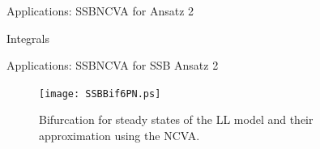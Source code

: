 \begin{frame}[c]{Applications: SSB}{NCVA for \textcolor{paleblue}{Ansatz 2} }%
\begin{block}{Integrals}
%
\end{block}
\end{frame}


\begin{frame}[c]{Applications: SSB}{NCVA for SSB \textcolor{paleblue}{Ansatz 2}}
\vspace{-1em}
\begin{figure}[H!]
\centering
\texttt{[image: SSBBif6PN.ps]}
\caption{Bifurcation for steady states of the LL model and their approximation using the NCVA.}
\end{figure}
\end{frame}

